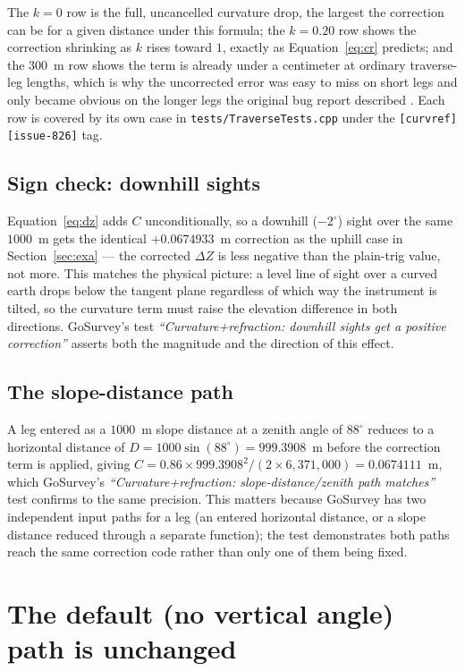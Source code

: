 \documentclass[11pt]{article}
\begin{document}
The $k=0$ row is the full, uncancelled curvature drop, the largest the
correction can be for a given distance under this formula; the $k=0.20$ row
shows the correction shrinking as $k$ rises toward $1$, exactly as
Equation~\ref{eq:cr} predicts; and the $300$~m row shows the term is
already under a centimeter at ordinary traverse-leg lengths, which is why
the uncorrected error was easy to miss on short legs and only became
obvious on the longer legs the original bug report described
\citep{issue826}. Each row is covered by its own case in
\texttt{tests/TraverseTests.cpp} under the \texttt{[curvref][issue-826]}
tag.

\subsection*{Sign check: downhill sights}

Equation~\ref{eq:dz} adds $C$ unconditionally, so a downhill
($-2^{\circ}$) sight over the same $1000$~m gets the identical
$+0.0674933$~m correction as the uphill case in
Section~\ref{sec:exa} --- the corrected $\Delta Z$ is less negative than
the plain-trig value, not more. This matches the physical picture: a level
line of sight over a curved earth drops below the tangent plane regardless
of which way the instrument is tilted, so the curvature term must raise
the elevation difference in both directions. GoSurvey's test
\emph{``Curvature+refraction: downhill sights get a positive correction''}
asserts both the magnitude and the direction of this effect.

\subsection*{The slope-distance path}

A leg entered as a $1000$~m slope distance at a zenith angle of
$88^{\circ}$ reduces to a horizontal distance of
$D = 1000\sin(88^{\circ}) = 999.3908$~m before the correction term is
applied, giving
$C = 0.86 \times 999.3908^{2}/(2\times 6{,}371{,}000) = 0.0674111$~m, which
GoSurvey's \emph{``Curvature+refraction: slope-distance/zenith path
matches''} test confirms to the same precision. This matters because
GoSurvey has two independent input paths for a leg (an entered horizontal
distance, or a slope distance reduced through a separate function); the
test demonstrates both paths reach the same correction code rather than
only one of them being fixed.

\section{The default (no vertical angle) path is unchanged}
\end{document}
